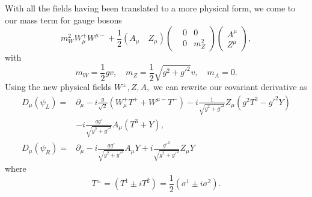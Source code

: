 \documentclass{report}
\numberwithin{equation}{section}
\begin{document}
With all the fields having been translated to a more physical form, we come to our mass term for gauge bosons
\begin{equation}
 m_W^2 W_\mu^+ W^{\mu-}+ \frac{1}{2}(A_\mu \quad Z_\mu)\begin{pmatrix}
&0 & 0\\
&0 & m_Z^2
\end{pmatrix}
\begin{pmatrix}
A^\mu\\
Z^\mu
\end{pmatrix},
\end{equation}
with
\begin{equation}
m_W=\frac{1}{2}gv,\quad m_Z=\frac{1}{2}\sqrt{g^2+g'^2}v,\quad m_A=0.
\end{equation}
Using the new physical fields $W^\pm, Z, A,$ we can rewrite our covariant derivative as
\begin{align}
D_\mu(\psi_L)=&\partial_\mu-i\frac{g}{\sqrt{2}}(W^+_\mu T^++W^{\mu-}T^-)-i\frac{1}{\sqrt{g^2+g'^2}}Z_\mu(g^2T^3-g'^2Y)\label{4}\\
&-i\frac{gg'}{\sqrt{g^2+g'^2}}A_\mu(T^3+Y),\nonumber\\
D_\mu(\psi_R)=&\partial_\mu -i\frac{gg'}{\sqrt{g^2+g'^2}} A_\mu Y +i\frac{g'^2}{\sqrt{g^2+g'^2}}Z_\mu Y
\end{align}
where
\begin{equation}
 T^\pm=(T^1\pm iT^2)=\frac{1}{2}(\sigma^1\pm i\sigma^2).
\end{equation}
\end{document}

